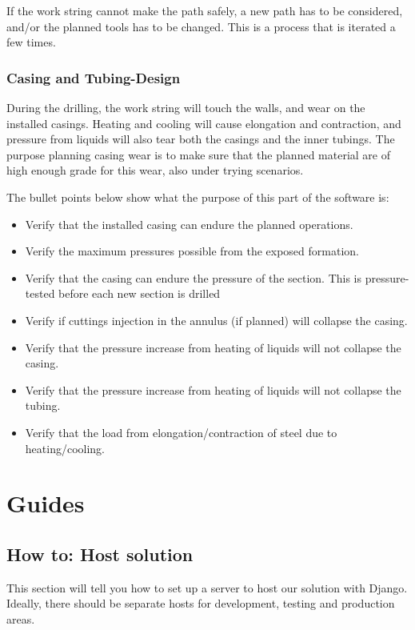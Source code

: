 \documentclass{report}
\begin{document}
If the work string cannot make the path safely, a new path has to be considered, and/or the planned tools has to be changed. This is a process that is iterated a few times.

\subsection{Casing and Tubing-Design}
During the drilling, the work string will touch the walls, and wear on the installed casings. Heating and cooling will cause elongation and contraction, and pressure from liquids will also tear both the casings and the inner tubings. The purpose planning casing wear is to make sure that the planned material are of high enough grade for this wear, also under trying scenarios.

The bullet points below show what the purpose of this part of the software is:
\begin{itemize}
    \item Verify that the installed casing can endure the planned operations.
    \item Verify the maximum pressures possible from the exposed formation.
    \item Verify that the casing can endure the pressure of the section. This is pressure-tested before each new section is drilled
    \item Verify if cuttings injection in the annulus (if planned) will collapse the casing.
    \item Verify that the pressure increase from heating of liquids will not collapse the casing.
    \item Verify that the pressure increase from heating of liquids will not collapse the tubing.
    \item Verify that the load from elongation/contraction of steel due to heating/cooling. 
\end{itemize}


\chapter{Guides} \label{cha:guides}

\section{How to: Host solution} \label{sec:host_solution}
This section will tell you how to set up a server to host our solution with Django. Ideally, there should be separate hosts for development, testing and production areas.
\end{document}
